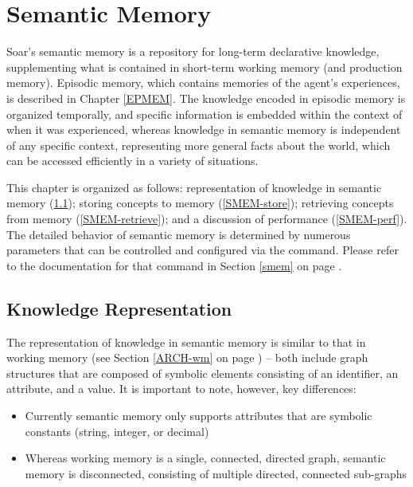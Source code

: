 \chapter{Semantic Memory}
\label{SMEM}

Soar's semantic memory is a repository for long-term declarative knowledge, supplementing what is contained in short-term working memory (and production memory). Episodic memory, which contains memories of the agent's experiences, is described in Chapter \ref{EPMEM}. The knowledge encoded in episodic memory is organized temporally, and specific information is embedded within the context of when it was experienced, whereas knowledge in semantic memory is independent of any specific context, representing more general facts about the world, which can be accessed efficiently in a variety of situations.

This chapter is organized as follows: representation of knowledge in semantic memory (\ref{SMEM-kr}); storing concepts to memory (\ref{SMEM-store}); retrieving concepts from memory (\ref{SMEM-retrieve}); and a discussion of performance (\ref{SMEM-perf}). The detailed behavior of semantic memory is determined by numerous parameters that can be controlled and configured via the  command. Please refer to the documentation for that command in Section \ref{smem} on page \pageref{smem}.

\section{Knowledge Representation}
\label{SMEM-kr}

The representation of knowledge in semantic memory is similar to that in working memory (see Section \ref{ARCH-wm} on page \pageref{ARCH-wm}) -- both include graph structures that are composed of symbolic elements consisting of an identifier, an attribute, and a value. It is important to note, however, key differences:

\begin{itemize}

\item Currently semantic memory only supports attributes that are symbolic constants (string, integer, or decimal)

\item Whereas working memory is a single, connected, directed graph, semantic memory is disconnected, consisting of multiple directed, connected sub-graphs

\end{itemize}

